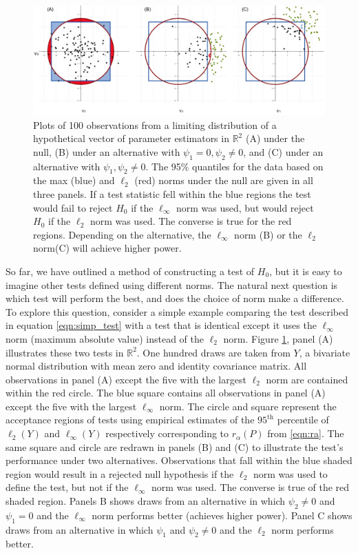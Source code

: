 \documentclass{article}
\newcommand{\rvt}{Y}
\begin{document}
\begin{figure}
	\centering
	\includegraphics[width = \linewidth]{figure_code/new_pwr_cmpr.jpeg}
	\caption{Plots of 100 observations from a limiting distribution of a hypothetical vector of parameter estimators in $\mathbb{R}^2$ (A) under the null, (B) under an alternative with $\psi_1 = 0, \psi_2 \neq 0$, and (C) under an alternative with $\psi_1, \psi_2 \neq 0$. The 95\% quantiles for the data based on the max (blue) and $\ell_2$ (red) norms under the null are given in all three panels. If a test statistic fell within the blue regions the test would fail to reject $H_0$ if the $\ell_\infty$ norm was used, but would reject $H_0$ if the $\ell_2$ norm was used.  The converse is true for the red regions.  Depending on the alternative, the $\ell_\infty$ norm (B) or the $\ell_2$ norm(C) will achieve higher power.}
	\label{fig:figure1}
\end{figure}

So far, we have outlined a method of constructing a test of $H_0$, but it is easy to imagine other tests defined using different norms. The natural next question is which test will perform the best, and does the choice of norm make a difference.  To explore this question, consider a simple example comparing the test described in equation \eqref{eqn:simp_test} with a test that is identical except it uses the $\ell_\infty$ norm (maximum absolute value) instead of the $\ell_2$ norm.  Figure \ref{fig:figure1}, panel (A) illustrates these two tests in $\mathbb{R}^2$. One hundred draws are taken from $Y$, a bivariate normal distribution with mean zero and identity covariance matrix. All observations in panel (A) except the five with the largest $\ell_2$ norm are contained within the red circle. The blue square contains all observations in panel (A) except the five with the largest $\ell_\infty$ norm.  The circle and square represent the acceptance regions of tests using empirical estimates of the $95^{\text{th}}$ percentile of $\ell_2(\rvt)$ and $\ell_\infty(\rvt)$ respectively corresponding to $r_\alpha(P)$ from \eqref{eqn:ra}.  The same square and circle are redrawn in panels (B) and (C) to illustrate the test's performance under two alternatives. Observations that fall within the blue shaded region would result in a rejected null hypothesis if the $\ell_2$ norm was used to define the test, but not if the $\ell_\infty$ norm was used. The converse is true of the red shaded region. Panels B shows draws from an alternative in which $\psi_2 \ne 0$ and $\psi_1 = 0$ and the $\ell_\infty$ norm performs better (achieves higher power). Panel C shows draws from an alternative in which $\psi_1$ and $\psi_2 \neq 0$ and the $\ell_2$ norm performs better. 
\end{document}
